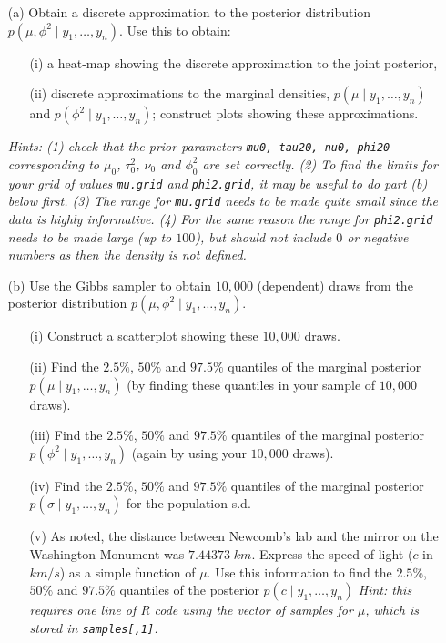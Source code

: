 \documentclass{article}
\newcommand{\1}{\mathbf{1}}
\begin{document}
\newpage
\begin{enumerate}
    \item[(a)] Obtain a discrete approximation to the posterior distribution $p(\mu,\phi^2 \mid y_1,\ldots ,y_n)$. Use this to obtain:
    \begin{enumerate}
        \item[(i)] a heat-map showing the discrete approximation to the joint posterior,
        \item[(ii)] discrete approximations to the marginal densities, $p(\mu \mid y_1,\ldots ,y_n)$ and $p(\phi^2 \mid y_1,\ldots ,y_n)$; construct plots showing these approximations.
    \end{enumerate}
    {\it Hints: (1) check that the prior parameters {\tt mu0, tau20, nu0, phi20} corresponding to $\mu_0$, $\tau^2_0$, $\nu_0$ and $\phi^2_0$ are set correctly. (2) To find the limits for your grid of values {\tt mu.grid} and {\tt phi2.grid}, it may be useful to do part (b) below first. (3) The range for {\tt mu.grid} needs to be made quite small since the data is highly informative. (4) For the same reason the range for {\tt phi2.grid} needs to be made large (up to $100$), but should not include $0$ or negative numbers as then the density is not defined.}
    
    
    \item[(b)] Use the Gibbs sampler to obtain $10,000$ (dependent) draws from the posterior distribution $p(\mu,\phi^2 \mid y_1,\ldots ,y_n)$. 
    
    

\begin{enumerate}
    \item[(i)] Construct a scatterplot showing these $10,000$ draws.
    
    \item[(ii)] Find the $2.5\%$, $50\%$ and $97.5\%$ quantiles of the marginal posterior $p(\mu \mid y_1,\ldots ,y_n)$ (by finding these quantiles in your sample of $10,000$ draws).
    
    \item[(iii)] Find the $2.5\%$, $50\%$ and $97.5\%$ quantiles of the marginal posterior $p(\phi^2 \mid y_1,\ldots ,y_n)$ (again by using your $10,000$ draws).
    
    \item[(iv)] Find the $2.5\%$, $50\%$ and $97.5\%$ quantiles of the marginal posterior $p(\sigma \mid y_1,\ldots ,y_n)$ for the population s.d. 
    
    \item[(v)] As noted, the distance between Newcomb's lab and the mirror on the Washington Monument was $7.44373\; km$. Express the speed of light ($c$ in $km/s$) as a simple function of $\mu$. Use this information to find the $2.5\%$, $50\%$ and $97.5\%$ quantiles of the posterior $p(c \mid y_1,\ldots ,y_n)$ {\it Hint: this requires one line of R code using the vector of samples for $\mu$, which is stored in {\tt samples[,1]}.}
    

\end{enumerate}
\end{enumerate}
\end{document}

